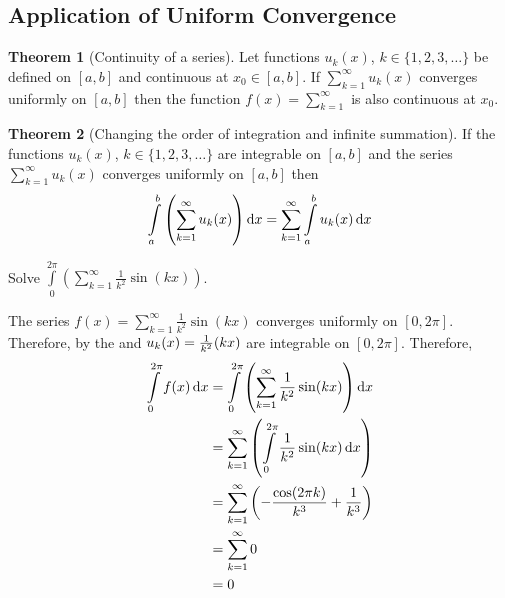 \documentclass[fleqn, a4paper, 8pt, twoside]{amsart}
\theoremstyle{definition}
\theoremstyle{bluedefinition}
\theoremstyle{redtheorem}
\newtheorem{theorem}{Theorem}
\begin{document}
\begin{multicols}{2}
\begin{spacing}{0.7}
\subsection{Application of Uniform Convergence}

\begin{theorem}[Continuity of a series]
	Let functions $u_k(x)$, $k \in \{1, 2, 3, \dots\}$ be defined on $[a,b]$ and continuous at $x_0 \in [a,b]$.
	If $\sum\limits_{k = 1}^{\infty} u_k(x)$ converges uniformly on $[a,b]$ then the function $f(x) = \sum\limits_{k = 1}^{\infty}$ is also continuous at $x_0$.
\end{theorem}

\begin{theorem}[Changing the order of integration and infinite summation]
	If the functions $u_k(x)$, $k \in \{1, 2, 3, \dots\}$ are integrable on $[a,b]$ and the series $\sum\limits_{k = 1}^{\infty} u_k(x)$ converges uniformly on $[a,b]$ then
	\begin{equation*}
		\int\limits_{a}^{b} \left( \sum\limits_{k = 1}^{\infty} u_k(x) \right) \dif x = \sum\limits_{k = 1}^{\infty} \int\limits_{a}^{b} u_k(x) \dif x
	\end{equation*}
\end{theorem}

\begin{question}
	Solve $\int\limits_{0}^{2 \pi} \left( \sum\limits_{k = 1}^{\infty} \frac{1}{k^2} \sin(k x) \right)$.
\end{question}

\begin{solution}
	The series $f(x) = \sum\limits_{k = 1}^{\infty} \frac{1}{k^2} \sin(k x)$ converges uniformly on $[0, 2 \pi]$.
	Therefore, by the  and $u_k(x) = \frac{1}{k^2} \si(k x)$ are integrable on $[0, 2 \pi]$.
	Therefore,
	\begin{align*}
		\int\limits_{0}^{2 \pi} f(x) \dif x &= \int\limits_{0}^{2 \pi} \left( \sum\limits_{k = 1}^{\infty} \frac{1}{k^2} \sin(k x) \right) \dif x\\
		&= \sum\limits_{k = 1}^{\infty} \left( \int\limits_{0}^{2 \pi} \frac{1}{k^2} \sin(k x) \dif x \right)\\
		&= \sum\limits_{k = 1}^{\infty} \left( -\frac{\cos(2 \pi k)}{k^3} + \frac{1}{k^3} \right)\\
		&= \sum\limits_{k = 1}^{\infty} 0\\
		&= 0
	\end{align*}
\end{solution}


\end{spacing}
\end{multicols}
\end{document}
